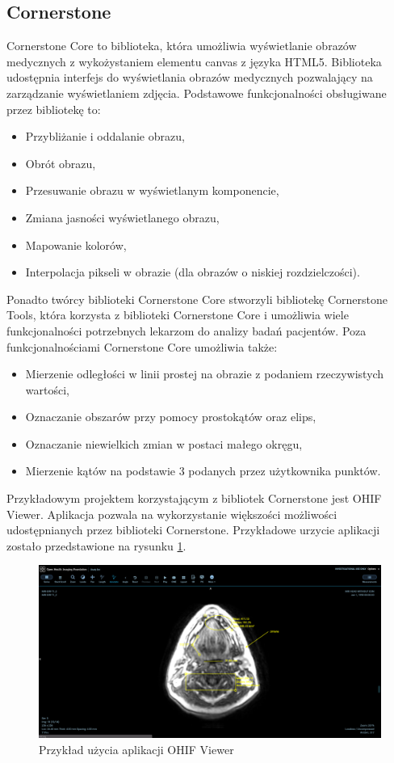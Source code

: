 \documentclass[a4paper,11pt,twoside]{report}
\theoremstyle{definition}
\begin{document}
\subsection {Cornerstone}

Cornerstone Core to biblioteka, która umożliwia wyświetlanie obrazów medycznych z wykożystaniem elementu canvas z języka HTML5. Biblioteka udostępnia interfejs do wyświetlania obrazów medycznych pozwalający na zarządzanie wyświetlaniem zdjęcia. Podstawowe funkcjonalności obsługiwane przez bibliotekę to:

\begin{itemize}[noitemsep]
\item Przybliżanie i oddalanie obrazu,
\item Obrót obrazu,
\item Przesuwanie obrazu w wyświetlanym komponencie,
\item Zmiana jasności wyświetlanego obrazu,
\item Mapowanie kolorów,
\item Interpolacja pikseli w obrazie (dla obrazów o niskiej rozdzielczości).
\end{itemize}

Ponadto twórcy biblioteki Cornerstone Core stworzyli bibliotekę Cornerstone Tools, która korzysta z biblioteki Cornerstone Core i umożliwia wiele funkcjonalności potrzebnych lekarzom do analizy badań pacjentów. Poza funkcjonalnościami Cornerstone Core umożliwia także:

\begin{itemize}[noitemsep]
\item Mierzenie odległości w linii prostej na obrazie z podaniem rzeczywistych wartości,
\item Oznaczanie obszarów przy pomocy prostokątów oraz elips,
\item Oznaczanie niewielkich zmian w postaci małego okręgu,
\item Mierzenie kątów na podstawie 3 podanych przez użytkownika punktów.
\end{itemize}

Przykładowym projektem korzystającym z bibliotek Cornerstone jest OHIF Viewer. Aplikacja pozwala na wykorzystanie większości możliwości udostępnianych przez biblioteki Cornerstone. Przykładowe urzycie aplikacji zostało przedstawione na rysunku \ref{fig:OHIF-example}.

\begin{figure}[h]
	\includegraphics[width=\textwidth]{OHIF-example}
	\caption{Przykład użycia aplikacji OHIF Viewer}
    	\label{fig:OHIF-example}
\end{figure}
\end{document}
